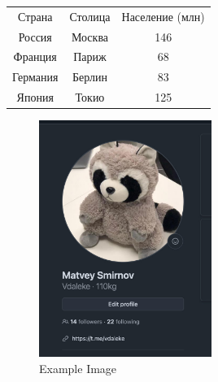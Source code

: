 \documentclass{article}
\begin{document}
\begin{tabular}{|c|c|c|}
\hline
Страна & Столица & Население (млн) \\
Россия & Москва & 146 \\
Франция & Париж & 68 \\
Германия & Берлин & 83 \\
Япония & Токио & 125 \\
\hline
\end{tabular}
\begin{figure}[htbp]
\centering
\includegraphics[width=0.5\textwidth]{photo_2025-03-16_21-45-04.jpg}
\caption{Example Image}
\label{fig:example_image}
\end{figure}
\end{document}
